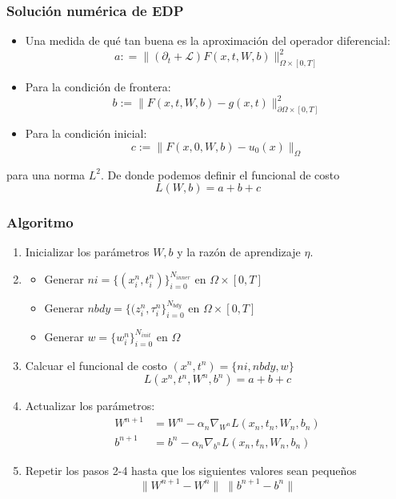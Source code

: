 \documentclass[aspectratio=1610]{beamer}
\begin{document}
\begin{frame}
  \frametitle{ Soluci\'on  num\'erica de EDP }
  \begin{itemize}
  \item  Una medida de qué tan buena es la  aproximación del operador diferencial:
  \begin{displaymath}
    a: = \| (\partial_t + \mathcal{L}) F(x,t,W,b) \|^2_{\Omega\times [0,T]}
  \end{displaymath}
  
\item Para la condición de frontera:
  \begin{displaymath}
    b:=\| F(x,t,W,b) - g({x},t)\|^2_{\partial \Omega \times [0,T]}
  \end{displaymath}
\item Para la condición inicial:
  \begin{displaymath}
   c:= \| F(x,0,W,b) - u_0(x)\|_{\Omega}
   \end{displaymath}
\end{itemize}
para una norma $L^2$. De donde podemos definir el funcional de costo 
\begin{displaymath}
  L(W,b) = a + b + c 
\end{displaymath}
\end{frame}

\begin{frame}
  \frametitle{ Algoritmo }
  \begin{enumerate}
  \item Inicializar los par\'ametros $W,b$ y la raz\'on de aprendizaje $\eta$.
  \item
    \begin{itemize}
    \item Generar $ni=\{(x^n_i,t^n_i)\}_{i=0}^{N_{inner}}$ en $\Omega\times [0,T]$
    \item Generar $nbdy=\{(z_i^n,\tau_i^n\}_{i=0}^{N_{bdy}}$ en $\Omega\times [0,T]$
    \item Generar $w=\{w_i^n\}_{i=0}^{N_{init}}$ en $\Omega$
    \end{itemize}
  \item Calcuar el funcional de costo $(x^n,t^n) = \{ ni,nbdy,w\}$
    \begin{displaymath}
      L(x^n,t^n,W^n,b^n) = a + b + c
    \end{displaymath}
  \item Actualizar los par\'ametros:
    \begin{align*}
      W^{n+1}  &= W^n - \alpha_n \nabla_{W^n} L(x_n,t_n,W_n,b_n) \\
      b^{n+1}  &= b^n - \alpha_n \nabla_{b^n} L(x_n,t_n,W_n,b_n)
    \end{align*}
  \item Repetir los pasos 2-4 hasta que los siguientes valores sean peque\~nos
    \begin{displaymath}
      \|W^{n+1} - W^n\| \; \|b^{n+1} - b^n\|
    \end{displaymath}

  \end{enumerate}
\end{frame}
\end{document}
